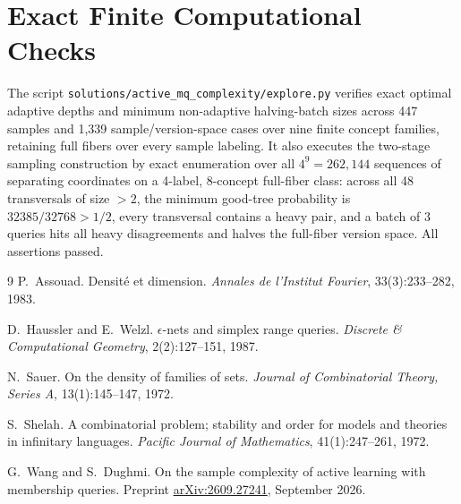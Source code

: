 \documentclass[11pt]{article}
\theoremstyle{plain}
\theoremstyle{definition}
\theoremstyle{remark}
\begin{document}
\section{Exact Finite Computational Checks}

The script \texttt{solutions/active\_mq\_complexity/explore.py} verifies exact optimal adaptive depths and minimum non-adaptive halving-batch sizes across 447 samples and 1,339 sample/version-space cases over nine finite concept families, retaining full fibers over every sample labeling. It also executes the two-stage sampling construction by exact enumeration over all $4^9 = 262{,}144$ sequences of separating coordinates on a 4-label, 8-concept full-fiber class: across all 48 transversals of size $> 2$, the minimum good-tree probability is $32385/32768 > 1/2$, every transversal contains a heavy pair, and a batch of $3$ queries hits all heavy disagreements and halves the full-fiber version space. All assertions passed.

\begin{thebibliography}{9}
P.~Assouad.
Densit\'e et dimension.
\emph{Annales de l'Institut Fourier}, 33(3):233--282, 1983.

D.~Haussler and E.~Welzl.
$\epsilon$-nets and simplex range queries.
\emph{Discrete \& Computational Geometry}, 2(2):127--151, 1987.

N.~Sauer.
On the density of families of sets.
\emph{Journal of Combinatorial Theory, Series A}, 13(1):145--147, 1972.

S.~Shelah.
A combinatorial problem; stability and order for models and theories in infinitary languages.
\emph{Pacific Journal of Mathematics}, 41(1):247--261, 1972.

G.~Wang and S.~Dughmi.
On the sample complexity of active learning with membership queries.
Preprint \href{https://arxiv.org/abs/2609.27241}{arXiv:2609.27241}, September 2026.
\end{thebibliography}
\end{document}
